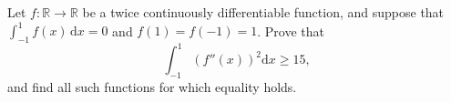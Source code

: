 Let \(f\colon  \mathbb{R} \to \mathbb{R}\) be a twice continuously differentiable function, and suppose that \(\int_{-1}^{1} f(x)\,\mathrm{d}x = 0\) and \(f(1) = f(-1) = 1\). Prove that
\[
\int_{-1}^{1} \left(f''(x)\right)^2 \mathrm{d}x \ge 15,
\]
and find all such functions for which equality holds.
